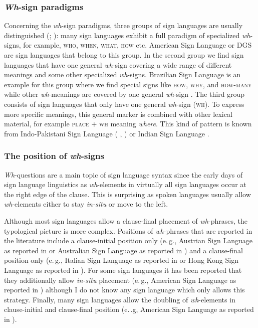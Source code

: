 \subsubsection{\textit{Wh}-sign paradigms}
Concerning the \textit{wh}-sign paradigms, three groups of sign languages are usually distinguished (\citealt{zeshan2004interrogative}; \citealt[295--296]{signgram2017}): many sign languages exhibit a full paradigm of specialized \textit{wh}-signs, for example, \textsc{who}, \textsc{when}, \textsc{what}, \textsc{how} etc. American Sign Language or DGS are sign languages that belong to this group. In the second group we find sign languages that have one general \textit{wh}-sign covering a wide range of different meanings and some other specialized \textit{wh}-signs. Brazilian Sign Language is an example for this group where we find special signs like \textsc{how}, \textsc{why}, and \textsc{how-many} while other \textit{wh}-meanings are covered by one general \textit{wh}-sign \citep{de2006questions}. The third group consists of sign languages that only have one general \textit{wh}-sign (\textsc{wh}). To express more specific meanings, this general marker is combined with other lexical material, for example \textsc{place} $+$ \textsc{wh} meaning \textit{where}. This kind of pattern is known from Indo-Pakistani Sign Language (\citeauthor{zeshan2004interrogative} \citeyear{zeshan2004interrogative}, \citeyear{zeshan2006negative}) or Indian Sign Language \citep{aboh2006wh}.


\subsubsection{The position of \textit{wh}-signs}
\textit{Wh}-questions are a main topic of sign language syntax since the early days of sign language linguistics as \textit{wh}-elements in virtually all sign languages occur at the right edge of the clause. This is surprising as spoken languages usually allow \textit{wh}-elements either to stay \textit{in-situ} or move to the left. 

Although most sign languages allow a clause-final placement of \textit{wh}-phrases, the typological picture is more complex. Positions of \textit{wh}-phrases that are reported in the literature include a clause-initial position only (e.\,g., Austrian Sign Language as reported in \citealt{schalber2006chin} or Australian Sign Language as reported in \citealt{johnston2007australian}) and a clause-final position only (e.\,g., Italian Sign Language as reported in \citealt{cecchetto2009another} or Hong Kong Sign Language as reported in \citealt{tang2006questions}). For some sign languages it has been reported that they additionally allow \textit{in-situ} placement (e.\,g., American Sign Language as reported in \citealt{neidle2000syntax}) although I do not know any sign language which only allows this strategy. Finally, many sign languages allow the doubling of \textit{wh}-elements in clause-initial and clause-final position (e.\,.g, American Sign Language as reported in \citealt{neidle2000syntax}).

